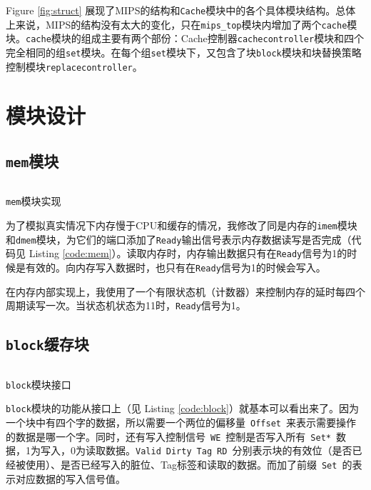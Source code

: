 \documentclass[12pt,a4paper]{article}
\newcommand{\incode}[1]{\texttt{#1}} %
\newcommand{\codefile}[1]{\inputminted[bgcolor=bg,linenos,tabsize=4]{verilog}{code/#1}} %
\begin{document}
Figure \ref{fig:struct} 展现了MIPS的结构和\incode{Cache}模块中的各个具体模块结构。总体上来说，MIPS的结构没有太大的变化，只在\incode{mips_top}模块内增加了两个\incode{cache}模块。\incode{cache}模块的组成主要有两个部份：Cache控制器\incode{cachecontroller}模块和四个完全相同的组\incode{set}模块。在每个组\incode{set}模块下，又包含了块\incode{block}模块和块替换策略控制模块\incode{replacecontroller}。

\section{模块设计}

\subsection{\incode{mem}模块}

\begin{listing}[htb]
	\codefile{mem.v}
	\caption{\incode{mem}模块实现}
	\label{code:mem}
\end{listing}

为了模拟真实情况下内存慢于CPU和缓存的情况，我修改了同是内存的\incode{imem}模块和\incode{dmem}模块，为它们的端口添加了\incode{Ready}输出信号表示内存数据读写是否完成（代码见 Listing \ref{code:mem}）。读取内存时，内存输出数据只有在\incode{Ready}信号为1的时候是有效的。向内存写入数据时，也只有在\incode{Ready}信号为1的时候会写入。

在内存内部实现上，我使用了一个有限状态机（计数器）来控制内存的延时每四个周期读写一次。当状态机状态为11时，\incode{Ready}信号为1。

\subsection{\incode{block}缓存块}

\begin{listing}[htb]
	\codefile{block.v}
	\caption{\incode{block}模块接口}
	\label{code:block}
\end{listing}

\incode{block}模块的功能从接口上（见 Listing \ref{code:block}）就基本可以看出来了。因为一个块中有四个字的数据，所以需要一个两位的偏移量\ \incode{Offset}\ 来表示需要操作的数据是哪一个字。同时，还有写入控制信号\ \incode{WE}\ 控制是否写入所有\ \incode{Set*}\ 数据，1为写入，0为读取数据。\incode{Valid}\ \incode{Dirty}\ \incode{Tag}\ \incode{RD}\ 分别表示块的有效位（是否已经被使用）、是否已经写入的脏位、Tag标签和读取的数据。而加了前缀\ \incode{Set}\ 的表示对应数据的写入信号值。
\end{document}
